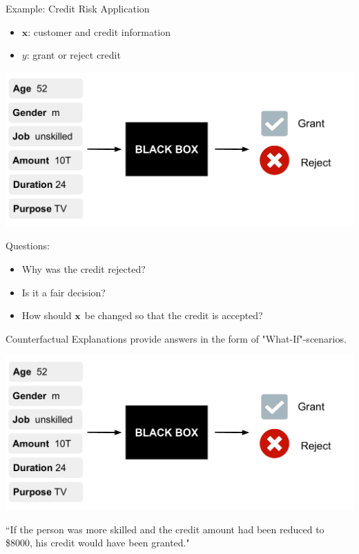 \documentclass[11pt,compress,t,notes=noshow, xcolor=table]{beamer}
\begin{document}
\begin{vbframe}{Example: Credit Risk Application} 
	\begin{itemize}
		\item $\textbf{x}$: customer and credit information
		\item $y$: grant or reject credit
	\end{itemize}
	\begin{center}\includegraphics[width=0.65\linewidth, page=1]{figure/counterfactuals_credit.pdf} \end{center}
	
	Questions: 
	\begin{itemize}
		\item Why was the credit rejected? 
		\item Is it a fair decision? 
		\item How should $\xv$ be changed so that the credit is accepted?  
	\end{itemize}
	
	\framebreak
	Counterfactual Explanations provide answers in the form of "What-If"-scenarios. 
	\begin{center}\includegraphics[width=0.65\linewidth, page=2]{figure/counterfactuals_credit.pdf} \end{center}
	
	``If the person was more skilled and the credit amount had been reduced to \$8000, his credit would have been granted."  \\[0.2cm]
	
	

\end{vbframe}
\end{document}
